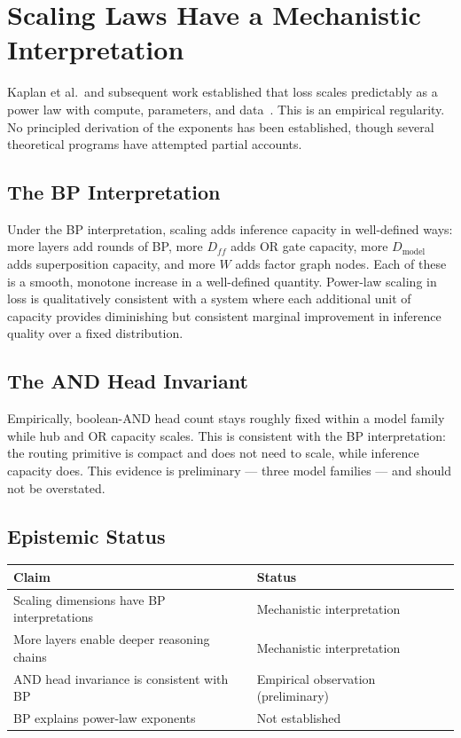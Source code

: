 \section{Scaling Laws Have a Mechanistic Interpretation}
\label{sec:scaling-laws}

Kaplan et al.\ and subsequent work established that loss scales predictably
as a power law with compute, parameters, and data~\cite{kaplan2020scaling}.
This is an empirical regularity. No principled derivation of the exponents
has been established, though several theoretical programs have attempted
partial accounts.

\subsection*{The BP Interpretation}

Under the BP interpretation, scaling adds inference capacity in well-defined
ways: more layers add rounds of BP, more $D_{ff}$ adds OR gate capacity,
more $D_{\mathrm{model}}$ adds superposition capacity, and more $W$ adds
factor graph nodes. Each of these is a smooth, monotone increase in a
well-defined quantity. Power-law scaling in loss is qualitatively consistent
with a system where each additional unit of capacity provides diminishing
but consistent marginal improvement in inference quality over a fixed
distribution.

\subsection*{The AND Head Invariant}

Empirically, boolean-AND head count stays roughly fixed within a model
family while hub and OR capacity scales. This is consistent with the BP
interpretation: the routing primitive is compact and does not need to scale,
while inference capacity does. This evidence is preliminary --- three model
families --- and should not be overstated.

\subsection*{Epistemic Status}

\begin{center}
\begin{tabular}{ll}
\toprule
Claim & Status \\
\midrule
Scaling dimensions have BP interpretations & Mechanistic interpretation \\
More layers enable deeper reasoning chains & Mechanistic interpretation \\
AND head invariance is consistent with BP & Empirical observation (preliminary) \\
BP explains power-law exponents & Not established \\
\bottomrule
\end{tabular}
\end{center}